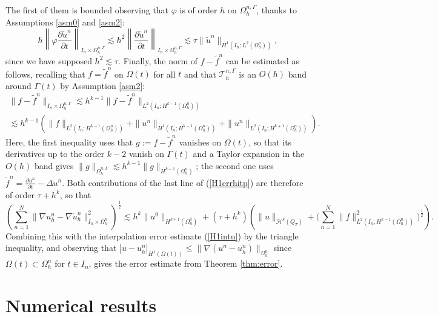 \documentclass[11pt,a4paper]{article}
\theoremstyle{plain}
\theoremstyle{definition}
\theoremstyle{remark}
\numberwithin{equation}{section}
\begin{document}
The first of them is bounded observing that $\varphi$ is of order $h$ on ${\Omega_h^{n,\Gamma}}$, thanks to Assumptions \ref{asm0} and \ref{asm2}:
\[ h\left\| \varphi \frac{\partial \tilde{u}^n}{\partial t} \right\|_{I_n \times {\Omega_h^{n,\Gamma}}} \lesssim h^2  \left\|
\frac{\partial \tilde{u}^n}{\partial t} \right\|_{I_n \times
	{\Omega_h^{n,\Gamma}}}
\lesssim \tau \|{\tilde u}^n \|_{H^1 (I_n ; {L^2}(\Omega^n_h))} ,\]
since we have supposed $h^2 \lesssim \tau$. Finally, the norm of   $f - \tilde{f}^n$ can be estimated as follows, recalling that $f = \tilde{f}^n$ on $\Omega (t)$ for all $t$ and that $\mathcal{T}_h^{n,\Gamma}$ is an $O(h)$ band around $\Gamma(t)$ by Assumption \ref{asm2}:
\begin{multline*} \|f - \tilde{f}^n \|_{I_n \times {\Omega_h^{n,\Gamma}}} \lesssim h^{k -
	1} \|f - \tilde{f}^n \|_{L^2 (I_n ; H^{k - 1} (\Omega^n_h))} \\ \lesssim h^{k -
	1} {\left(\|f\|_{L^2 (I_n ; H^{k - 1} (\Omega^n_h))} + \|u^n\|_{H^1(I_n;H^{k-1}(\Omega_h^n))} + \|u^n\|_{L^2 (I_n; H^{k + 1} (\Omega^n_h))}\right)} .
\end{multline*}
{Here, the first inequality uses that $g:=f-\tilde f^n$ vanishes on $\Omega(t)$, so that its derivatives up to the order $k-2$ vanish on $\Gamma(t)$ and a Taylor expansion in the $O(h)$ band gives $\|g\|_{\Omega_h^{n,\Gamma}}\lesssim h^{k-1}\|g\|_{H^{k-1}(\Omega_h^n)}$; the second one uses $\tilde f^n=\frac{\partial u^n}{\partial t}-\Delta u^n$.}
{Both contributions of the last line of (\ref{H1errhitp}) are therefore of order $\tau + h^{k}$, so that}
\[ {\left( \sum_{n = 1}^N \| \nabla u^n_h - \nabla \check{u}^n_h \|_{I_n \times\Omega_h^n}^2 \right)^{\frac{1}{2}}
\lesssim  h^k \| u^0 \|_{H^{k+1} (\Omega_h^0)} + (\tau+h^k)\left( \|u\|_{\mathcal{H}^k (Q_T)} + \Big(\sum_{n = 1}^N \| f \|_{L^2 (I_n ; H^{k - 1} (\Omega^n_h))}^2\Big)^{\frac12} \right) .} \]
{Combining this with the interpolation error estimate (\ref{H1intu}) by the triangle inequality, and observing that $|u-u^n_h|_{H^1(\Omega(t))}\leqslant \|\nabla(u^n-u^n_h)\|_{\Omega_h^n}$ since $\Omega(t)\subset\Omega_h^n$ for $t\in I_n$, gives the error estimate from Theorem \ref{thm:error}.}




\section{Numerical results}
\label{Sect:Numerical_results}
\end{document}
